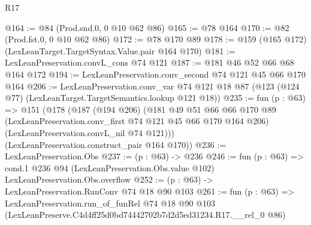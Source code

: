 \begin{lexlean}{R17}
\begin{coremodule}
@164 := @84 (Prod.snd.{0, 0} @10 @62 @86)
@165 := @78 @164
@170 := @82 (Prod.fst.{0, 0} @10 @62 @86)
@172 := @78 @170 @89
@178 := @159 (@165 @172) (LexLeanTarget.TargetSyntax.Value.pair @164 @170)
@181 := LexLeanPreservation.convL_cons @74 @121
@187 := @181 @46 @52 @66 @68 @164 @172
@194 := LexLeanPreservation.conv_second @74 @121 @45 @66 @170 @164
@206 := LexLeanPreservation.conv_var
    @74
    @121
    @18
    @87
    (@123 (@124 @77) (LexLeanTarget.TargetSemantics.lookup @121 @18))
@235 := fun (p : @63) =>
  @151
    (@178
      (@187
        (@194 @206)
        (@181
          @49
          @51
          @66
          @66
          @170
          @89
          (LexLeanPreservation.conv_first @74 @121 @45 @66 @170 @164 @206)
          (LexLeanPreservation.convL_nil @74 @121)))
      (LexLeanPreservation.construct_pair @164 @170))
@236 := LexLeanPreservation.Obs
@237 := (p : @63) -> @236
@246 := fun (p : @63) =>
  cond.{1} @236 @94 (LexLeanPreservation.Obs.value @102) LexLeanPreservation.Obs.overflow
@252 := (p : @63) -> LexLeanPreservation.RunConv @74 @18 @90 @103
@261 := fun (p : @63) =>
  LexLeanPreservation.run_of_funRel
    @74
    @18
    @90
    @103
    (LexLeanPreserve.C4d4ff25d0bd74442702b7d2d5ed31234.R17.__rel_0 @86)
\end{coremodule}
\end{lexlean}
